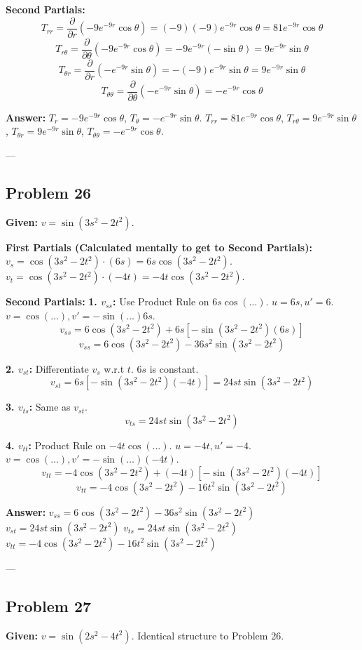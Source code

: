 \documentclass{article}
\begin{document}
\textbf{Second Partials:}
\[ T_{rr} = \frac{\partial}{\partial r}(-9e^{-9r} \cos \theta) = (-9)(-9)e^{-9r} \cos \theta = 81e^{-9r} \cos \theta \]
\[ T_{r\theta} = \frac{\partial}{\partial \theta}(-9e^{-9r} \cos \theta) = -9e^{-9r} (-\sin \theta) = 9e^{-9r} \sin \theta \]
\[ T_{\theta r} = \frac{\partial}{\partial r}(-e^{-9r} \sin \theta) = -(-9)e^{-9r} \sin \theta = 9e^{-9r} \sin \theta \]
\[ T_{\theta \theta} = \frac{\partial}{\partial \theta}(-e^{-9r} \sin \theta) = -e^{-9r} \cos \theta \]

\textbf{Answer:}
$T_r = -9e^{-9r} \cos \theta$, $T_\theta = -e^{-9r} \sin \theta$.
$T_{rr} = 81e^{-9r} \cos \theta$, $T_{r\theta} = 9e^{-9r} \sin \theta$, $T_{\theta r} = 9e^{-9r} \sin \theta$, $T_{\theta \theta} = -e^{-9r} \cos \theta$.

---

\subsection*{Problem 26}
\textbf{Given:} $v = \sin(3s^2 - 2t^2)$.

\textbf{First Partials (Calculated mentally to get to Second Partials):}
$v_s = \cos(3s^2 - 2t^2) \cdot (6s) = 6s \cos(3s^2 - 2t^2)$.
$v_t = \cos(3s^2 - 2t^2) \cdot (-4t) = -4t \cos(3s^2 - 2t^2)$.

\textbf{Second Partials:}
\textbf{1. $v_{ss}$:} Use Product Rule on $6s \cos(\dots)$.
$u = 6s, u' = 6$. $v = \cos(\dots), v' = -\sin(\dots)6s$.
\[ v_{ss} = 6 \cos(3s^2 - 2t^2) + 6s [-\sin(3s^2 - 2t^2)(6s)] \]
\[ v_{ss} = 6 \cos(3s^2 - 2t^2) - 36s^2 \sin(3s^2 - 2t^2) \]

\textbf{2. $v_{st}$:} Differentiate $v_s$ w.r.t $t$.
$6s$ is constant.
\[ v_{st} = 6s [-\sin(3s^2 - 2t^2)(-4t)] = 24st \sin(3s^2 - 2t^2) \]

\textbf{3. $v_{ts}$:} Same as $v_{st}$.
\[ v_{ts} = 24st \sin(3s^2 - 2t^2) \]

\textbf{4. $v_{tt}$:} Product Rule on $-4t \cos(\dots)$.
$u = -4t, u' = -4$. $v = \cos(\dots), v' = -\sin(\dots)(-4t)$.
\[ v_{tt} = -4 \cos(3s^2 - 2t^2) + (-4t) [-\sin(3s^2 - 2t^2)(-4t)] \]
\[ v_{tt} = -4 \cos(3s^2 - 2t^2) - 16t^2 \sin(3s^2 - 2t^2) \]

\textbf{Answer:}
$v_{ss} = 6 \cos(3s^2 - 2t^2) - 36s^2 \sin(3s^2 - 2t^2)$
$v_{st} = 24st \sin(3s^2 - 2t^2)$
$v_{ts} = 24st \sin(3s^2 - 2t^2)$
$v_{tt} = -4 \cos(3s^2 - 2t^2) - 16t^2 \sin(3s^2 - 2t^2)$

---

\subsection*{Problem 27}
\textbf{Given:} $v = \sin(2s^2 - 4t^2)$.
Identical structure to Problem 26.
\end{document}
